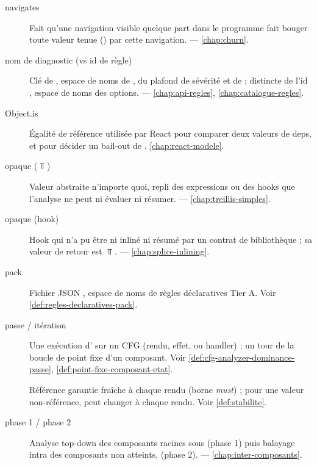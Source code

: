 \begin{description}
\item[navigates] Fait qu'une navigation visible quelque part dans le programme fait bouger toute valeur tenue () par cette navigation.  — \cref{chap:churn}.

\item[nom de diagnostic (vs id de règle)] Clé de , espace de noms de , du plafond de sévérité et de  ; distincte de l'id , espace de noms des options.  — \cref{chap:api-regles}, \cref{chap:catalogue-regles}.

\item[Object.is] Égalité de référence utilisée par React pour comparer deux valeurs de deps, et pour décider un bail-out de . \cref{chap:react-modele}.

\item[opaque (\(\Top\))] Valeur abstraite \og n'importe quoi\fg{}, repli des expressions ou des hooks que l'analyse ne peut ni évaluer ni résumer.  — \cref{chap:treillis-simples}.

\item[opaque (hook)] Hook qui n'a pu être ni inliné ni résumé par un contrat de bibliothèque ; sa valeur de retour est \(\Top\).  — \cref{chap:splice-inlining}.

\item[pack] Fichier JSON , espace de noms de règles déclaratives Tier A. Voir \cref{def:regles-declaratives-pack}.

\item[passe / itération] Une exécution d' sur un CFG (rendu, effet, ou handler) ; un tour de la boucle de point fixe d'un composant. Voir \cref{def:cfg-analyzer-dominance-passe}, \cref{def:point-fixe-composant-etat}.

\item[] Référence garantie fraîche à chaque rendu (borne \emph{must}) ; pour une valeur non-référence, \og peut changer à chaque rendu\fg{}. Voir \cref{def:stabilite}.

\item[phase 1 / phase 2] Analyse top-down des composants racines sous  (phase 1) puis balayage intra des composants non atteints,  (phase 2).  — \cref{chap:inter-composants}.


\end{description}

